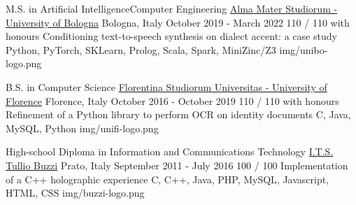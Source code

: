 
\begin{cventries}

  \logocventry
    {M.S. in Artificial Intelligence{\enskip\cdotp\enskip}Computer Engineering}
    {\href{https://www.unibo.it/en/homepage}{Alma Mater Studiorum - University of Bologna}}
    {Bologna, Italy}
    {October 2019 - March 2022}
    {
      \cvedu
        {110 / 110 with honours}
        {Conditioning text-to-speech synthesis on dialect accent: a case study}
        {Python, PyTorch, SKLearn, Prolog, Scala, Spark, MiniZinc/Z3}
    }
    {img/unibo-logo.png}

  \logocventry
    {B.S. in Computer Science}
    {\href{https://www.unifi.it/}{Florentina Studiorum Universitas - University of Florence}}
    {Florence, Italy}
    {October 2016 - October 2019}
    {
      \cvedu
        {110 / 110 with honours}
        {Refinement of a Python library to perform OCR on identity documents}
        {C, Java, MySQL, Python}
    }
    {img/unifi-logo.png}

  \logocventry
    {High-school Diploma in Information and Communications Technology}
    {\href{https://www.tulliobuzzi.edu.it/}{I.T.S. Tullio Buzzi}}
    {Prato, Italy}
    {September 2011 - July 2016}
    {
      \cvedu
        {100 / 100}
        {Implementation of a C++ holographic experience}
        {C, C++, Java, PHP, MySQL, Javascript, HTML, CSS}
    }
    {img/buzzi-logo.png}

\end{cventries}
